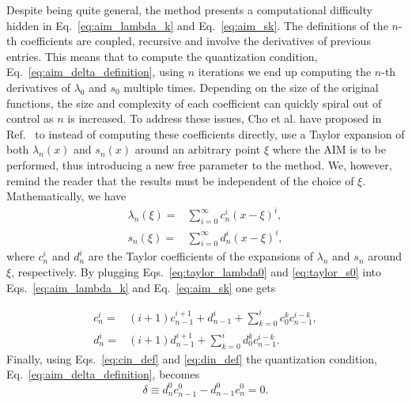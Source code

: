 Despite being quite general, the method presents a computational difficulty hidden in Eq.~\eqref{eq:aim_lambda_k} and Eq.~\eqref{eq:aim_sk}. The definitions of the $n$-th coefficients are coupled, recursive and involve the derivatives of previous entries. This means that to compute the quantization condition, Eq.~\eqref{eq:aim_delta_definition}, using $n$ iterations we end up computing the $n$-th derivatives of $\lambda_0$ and $s_0$ multiple times. Depending on the size of the original functions, the size and complexity of each coefficient can quickly spiral out of control as $n$ is increased. To address these issues, Cho et al. have proposed in Ref.~\cite{aim_improved} to instead of computing these coefficients directly, use a Taylor expansion of both $\lambda_n(x)$ and $s_n(x)$ around an arbitrary point $\xi$ where the AIM is to be performed, thus introducing a new free parameter to the method. We, however, remind the reader that the results must be independent of the choice of $\xi$. Mathematically, we have
%
\begin{align}
  \lambda_n(\xi) = & \sum_{i=0}^{\infty}c^{i}_n(x - \xi)^i, \label{eq:taylor_lambda0} \\
  s_n(\xi) =       & \sum_{i=0}^{\infty}d^{i}_n(x - \xi)^i, \label{eq:taylor_s0}
\end{align}
%
where $c^i_n$ and $d^i_n$ are the Taylor coefficients of the expansions of $\lambda_n$ and $s_n$ around $\xi$, respectively. By plugging Eqs.~\eqref{eq:taylor_lambda0} and \eqref{eq:taylor_s0} into Eqs.~\eqref{eq:aim_lambda_k} and Eq.~\eqref{eq:aim_sk} one gets

\begin{align}
  c^i_n = & (i+1)c^{i+1}_{n-1} + d^i_{n-1} + \sum_{k=0}^{i}c^k_0c^{i-k}_{n-1}, \label{eq:cin_def} \\
  d^i_n = & (i+1)d^{i+1}_{n-1} + \sum_{k=0}^{i}d^k_0c^{i-k}_{n-1}. \label{eq:din_def}
\end{align}
%
Finally, using Eqs.~\eqref{eq:cin_def} and \eqref{eq:din_def} the quantization condition, Eq.~\eqref{eq:aim_delta_definition}, becomes
%
\begin{equation}
  \delta \equiv d^0_n c^0_{n-1} - d^0_{n-1}c^0_n = 0.
  \label{eq:improved_delta}
\end{equation}

